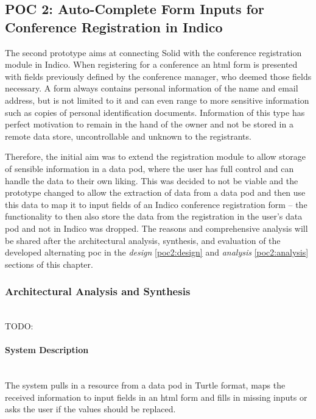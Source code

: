 \subsection{POC 2: Auto-Complete Form Inputs for Conference Registration in Indico}

The second prototype aims at connecting Solid with the conference registration module in Indico. When registering for a conference an \gls{html} form is presented with fields previously defined by the conference manager, who deemed those fields necessary. A form always contains personal information of the name and email address, but is not limited to it and can even range to more sensitive information such as copies of personal identification documents. Information of this type has perfect motivation to remain in the hand of the owner and not be stored in a remote data store, uncontrollable and unknown to the registrants.

Therefore, the initial aim was to extend the registration module to allow storage of sensible information in a data pod, where the user has full control and can handle the data to their own liking. This was decided to not be viable and the prototype changed to allow the extraction of data from a data pod and then use this data to map it to input fields of an Indico conference registration form -- the functionality to then also store the data from the registration in the user's data pod and not in Indico was dropped. The reasons and comprehensive analysis will be shared after the architectural analysis, synthesis, and evaluation of the developed alternating \gls{poc} in the \textit{design} \ref{poc2:design} and \textit{analysis} \ref{poc2:analysis} sections of this chapter.

\subsubsection{Architectural Analysis and Synthesis}\mbox{}\\

TODO:
\vspace{0.5cm}
\paragraph{System Description}\mbox{}\\

The system pulls in a resource from a data pod in Turtle format, maps the received information to input fields in an \gls{html} form and fills in missing inputs or asks the user if the values should be replaced.

